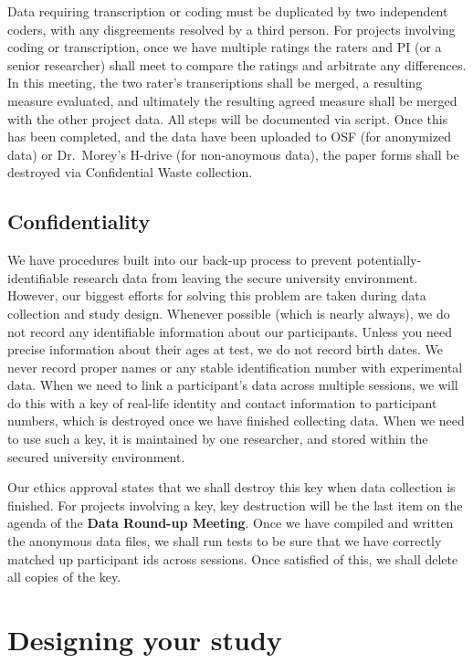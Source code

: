 \documentclass[
  12pt,
]{book}
\begin{document}
Data requiring transcription or coding must be duplicated by two independent coders, with any disgreements resolved by a third person. For projects involving coding or transcription, once we have multiple ratings the raters and PI (or a senior researcher) shall meet to compare the ratings and arbitrate any differences. In this meeting, the two rater's transcriptions shall be merged, a resulting measure evaluated, and ultimately the resulting agreed measure shall be merged with the other project data. All steps will be documented via script. Once this has been completed, and the data have been uploaded to OSF (for anonymized data) or Dr.~Morey's H-drive (for non-anoymous data), the paper forms shall be destroyed via Confidential Waste collection.

\section{Confidentiality}\label{confidentiality}

We have procedures built into our back-up process to prevent potentially-identifiable research data from leaving the secure university environment. However, our biggest efforts for solving this problem are taken during data collection and study design. Whenever possible (which is nearly always), we do not record any identifiable information about our participants. Unless you need precise information about their ages at test, we do not record birth dates. We never record proper names or any stable identification number with experimental data. When we need to link a participant's data across multiple sessions, we will do this with a key of real-life identity and contact information to participant numbers, which is destroyed once we have finished collecting data. When we need to use such a key, it is maintained by one researcher, and stored within the secured university environment.

Our ethics approval states that we shall destroy this key when data collection is finished. For projects involving a key, key destruction will be the last item on the agenda of the \textbf{Data Round-up Meeting}. Once we have compiled and written the anonymous data files, we shall run tests to be sure that we have correctly matched up participant ids across sessions. Once satisfied of this, we shall delete all copies of the key.

\chapter{Designing your study}\label{designing-your-study}
\end{document}
